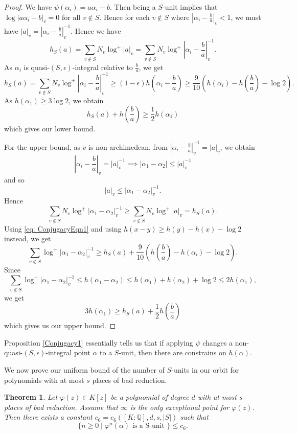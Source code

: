 \documentclass[10pt, reqno]{amsart}
\newcommand{\bb}{\mathbb}
\newcommand{\vphi}{\varphi}
\newtheorem{theorem}{Theorem}
\numberwithin{theorem}{section}
\numberwithin{equation}{section}
\numberwithin{example}{section}
\numberwithin{definition}{section}
\begin{document}
\begin{proof}
We have $\psi(\alpha_i) = a \alpha_i - b$. Then being a $S$-unit implies that $\log |a \alpha_i-b|_v = 0$ for all $v \not \in S$. Hence for each $v \not \in S$ where $|\alpha_i - \frac{b}{a}|_v < 1$, we must have $|a|_v = |\alpha_i - \frac{b}{a}|^{-1}_v$.
Hence we have 
$$h_S(a) = \sum_{v \not \in S} N_v\log^+|a|_v = \sum_{v \not \in S} N_v \log^+ \left| \alpha_i - \frac{b}{a} \right|^{-1}_v.$$
As $\alpha_i$ is quasi-$(S,\epsilon)$-integral relative to $\frac{b}{a}$, we get 
\begin{equation} \label{eq: ConjugacyEqn1} 
h_S(a) = \sum_{v \not \in S} N_v \log^+ \left| \alpha_i - \frac{b}{a} \right|^{-1}_v \geq (1-\epsilon)h\left(\alpha_i - \frac{b}{a} \right) \geq \frac{9}{10} \left(h(\alpha_i) - h\left(\frac{b}{a} \right) - \log 2 \right).
\end{equation}
As $h(\alpha_1) \geq 3 \log 2$, we obtain  
$$h_S(a) + h\left(\frac{b}{a} \right) \geq \frac{1}{2} h(\alpha_1)$$
which gives our lower bound.
\par 
For the upper bound, as $v$ is non-archimedean, from $\left|\alpha_i - \frac{b}{a} \right|^{-1}_v = |a|_v$, we obtain 
$$\left|\alpha_i - \frac{b}{a} \right|_v = |a|^{-1}_v \implies |\alpha_1 - \alpha_2| \leq |a|^{-1}_v$$
and so
$$|a|_v \leq |\alpha_1 - \alpha_2|_v^{-1}.$$
Hence 
$$\sum_{v \not \in S} N_v \log^+|\alpha_1 - \alpha_2|^{-1}_v \geq \sum_{v \not \in S} N_v \log^+|a|_v = h_S(a).$$
Using \eqref{eq: ConjugacyEqn1} and using $h(x-y) \geq h(y) - h(x) - \log 2$ instead, we get
$$\sum_{v \not \in S} \log^+|\alpha_1 - \alpha_2|_v^{-1} \geq  h_S(a) + \frac{9}{10} \left( h\left(\frac{b}{a} \right) - h(\alpha_i) - \log 2 \right).$$
Since 
$$\sum_{v \not \in S} \log^+|\alpha_1 - \alpha_2|_v^{-1} \leq h(\alpha_1 - \alpha_2) \leq h(\alpha_1) + h(\alpha_2 ) + \log 2 \leq 2 h(\alpha_1),$$
we get 
$$3h(\alpha_1) \geq  h_S(a) + \frac{1}{2} h \left(\frac{b}{a} \right)$$
which gives us our upper bound.

\end{proof}

Proposition \ref{Conjugacy1} essentially tells us that if applying $\psi$ changes a non-quasi-$(S,\epsilon)$-integral point $\alpha$ to a $S$-unit, then there are constrains on $h(\alpha)$. 
\par 
We now prove our uniform bound of the number of $S$-units in our orbit for polynomials with at most $s$ places of bad reduction.

\begin{theorem} \label{UniformSIntegral1}
Let $\vphi(z) \in K[z]$ be a polynomial of degree $d$ with at most $s$ places of bad reduction. Assume that $\infty$ is the only exceptional point for $\vphi(z)$. Then there exists a constant $c_6 = c_6([K:\bb{Q}],d,s,|S|)$ such that
$$\{n \geq 0 \mid \vphi^n(\alpha) \text{ is a S-unit } \} \leq c_6.$$
\end{theorem}
\end{document}
